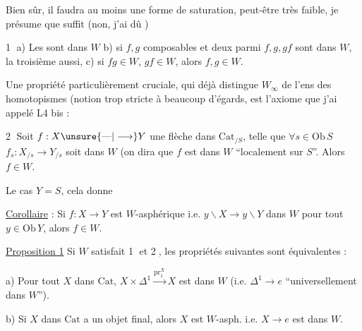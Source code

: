 Bien sûr, il faudra au moins une forme de saturation, peut-être très faible, je présume que  suffit (non, j'ai dû )


\textcircled{1} a) Les  sont dans $W$  b) si $f,g$ composables et deux parmi $f,g,gf$ sont dans $W$, la troisième aussi, c) si $fg\in W$, $gf\in W$, alors $f,g\in W$.


Une  propriété particulièrement cruciale, qui déjà distingue $W_\infty$ de l'ens des homotopismes (notion trop stricte à beaucoup d'égards, est l'axiome que j'ai appelé L4 bis :


\textcircled{2} Soit $f:X\unsure{\text{---}|\longrightarrow}Y$ une flèche dans $\mathrm{Cat}_{/S}$, telle que $\forall s\in\mathrm{Ob}\,S$ $f_s:X_{/s}\longrightarrow Y_{/s}$ soit dans $W$ (on dira que $f$ est  dans $W$ ``localement sur $S$''. Alors $f\in W$.

  Le cas $Y=S$, cela donne

\uline{Corollaire} : Si $f:X\longrightarrow Y$ est $W$-asphérique i.e. $y\backslash X\longrightarrow y\backslash Y$  dans $W$ pour tout $y\in\mathrm{Ob}\,Y$, alors $f\in W$.


\uline{Proposition 1} Si $W$ satisfait \textcircled{1} et \textcircled{2},   les propriétés suivantes  sont équivalentes :

a) Pour tout $X$ dans $\mathrm{Cat}$, $X\times\Delta^1\mathrel{\mathop{\longrightarrow}\limits^{\mathrm{pr}_1^X}}X$ est dans $W$ (i.e. $\Delta^1\longrightarrow e$ ``universellement dans $W$'').

b) Si $X$ dans $\mathrm{Cat}$ a un objet final, alors $X$ est $W$-asph. i.e. $X\longrightarrow e$ est dans $W$.

